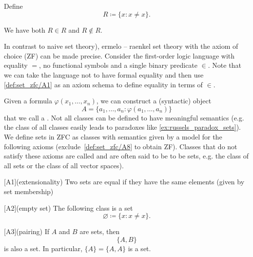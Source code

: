 \begin{example}\label{ex:russels_paradox_sets}
  Define
  \begin{equation*}
    R \coloneqq \{ x \colon x \neq x \}.
  \end{equation*}

  We have both \( R \in R \) and \( R \not\in R \).
\end{example}

\begin{definition}\label{def:set_zfc}\cite[271]{Enderton1977}
  In contrast to naive set theory), ermelo – raenkel set theory with the axiom of choice (ZF) can be made precise. Consider the first-order logic language with equality \( = \), no functional symbols and a single binary predicate \( \in \). Note that we can take the language not to have formal equality and then use \cref{def:set_zfc/A1} as an axiom schema to define equality in terms of \( \in \).

  Given a formula \( \varphi(x_1, \ldots, x_n) \), we can construct a (syntactic) object
  \begin{equation*}
    A = \{ a_1, \ldots, a_n \colon \varphi(a_1, \ldots, a_n) \}
  \end{equation*}
  that we call a . Not all classes can be defined to have meaningful semantics (e.g. the class of all classes easily leads to paradoxes like \cref{ex:russels_paradox_sets}). We define sets in ZFC as classes with semantics given by a model for the following axioms (exclude~\ref{def:set_zfc/A8} to obtain ZF). Classes that do not satisfy these axioms are called  and are often said to be  to be sets, e.g. the class of all sets or the class of all vector spaces).

  \begin{description}
    [A1](extensionality) Two sets are equal if they have the same elements (given by set membership)

    [A2](empty set) The following class is a set
    \begin{equation*}
      \varnothing \coloneqq \{ x \colon x \neq x \}.
    \end{equation*}

    [A3](pairing) If \( A \) and \( B \) are sets, then
    \begin{equation*}
      \{ A, B \}
    \end{equation*}
    is also a set. In particular, \( \{ A \} = \{ A, A \} \) is a set.


\end{description}
\end{definition}

